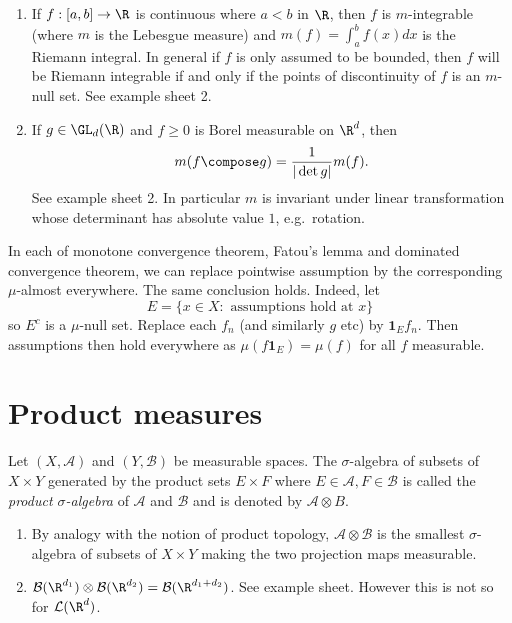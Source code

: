 \documentclass[a4paper]{article}
\begin{document}
\begin{remark}\leavevmode
  \begin{enumerate}
  \item If \(f: [a, b] \to \R\) is continuous where \(a < b\) in \(\R\), then \(f\) is \(m\)-integrable (where \(m\) is the Lebesgue measure) and \(m(f) = \int_a^b f(x)dx\) is the Riemann integral. In general if \(f\) is only assumed to be bounded, then \(f\) will be Riemann integrable if and only if the points of discontinuity of \(f\) is an \(m\)-null set. See example sheet 2.
  \item If \(g \in \GL_d(\R)\) and \(f \geq 0\) is Borel measurable on \(\R^d\), then
    \[
      m(f \compose g) = \frac{1}{|\det g|} m(f).
    \]
    See example sheet 2. In particular \(m\) is invariant under linear transformation whose determinant has absolute value \(1\), e.g.\ rotation.
  \end{enumerate}
\end{remark}

\begin{remark}
  In each of monotone convergence theorem, Fatou's lemma and dominated convergence theorem, we can replace pointwise assumption by the corresponding \(\mu\)-almost everywhere. The same conclusion holds. Indeed, let
  \[
    E = \{x \in X: \text{ assumptions hold at } x\}
  \]
  so \(E^c\) is a \(\mu\)-null set. Replace each \(f_n\) (and similarly \(g\) etc) by \(\mathbf 1_E f_n\). Then assumptions then hold everywhere as \(\mu(f \mathbf 1_E) = \mu(f)\) for all \(f\) measurable.
\end{remark}

\section{Product measures}

\begin{definition}
  Let \((X, \mathcal A)\) and \((Y, \mathcal B)\) be measurable spaces. The \(\sigma\)-algebra of subsets of \(X \times Y\) generated by the product sets \(E \times F\) where \(E \in \mathcal A, F \in \mathcal B\) is called the \emph{product \(\sigma\)-algebra} of \(\mathcal A\) and \(\mathcal B\) and is denoted by \(\mathcal A \otimes B\).
\end{definition}

\begin{remark}\leavevmode
  \begin{enumerate}
  \item By analogy with the notion of product topology, \(\mathcal A \otimes \mathcal B\) is the smallest \(\sigma\)-algebra of subsets of \(X \times Y\) making the two projection maps measurable.
  \item \(\mathcal B(\R^{d_1}) \otimes \mathcal B(\R^{d_2}) = \mathcal B(\R^{d_1 + d_2})\). See example sheet. However this is not so for \(\mathcal L(\R^d)\).
  \end{enumerate}
\end{remark}
\end{document}
